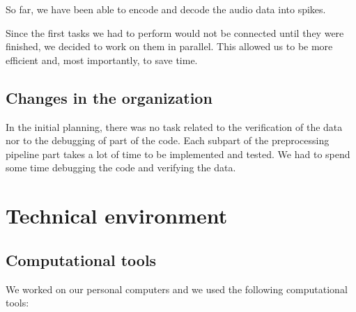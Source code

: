 \documentclass[11pt]{article}
\begin{document}
So far, we have been able to encode and decode the audio data into spikes.


Since the first tasks we had to perform would not be connected until they were finished, we decided to work on them in parallel. This allowed us to be more efficient and, most importantly, to save time.

\subsection{Changes in the organization}

In the initial planning, there was no task related to the verification of the data nor to the debugging of part of the code. Each subpart of the preprocessing pipeline part takes a lot of time to be implemented and tested. We had to spend some time debugging the code and verifying the data.


\pagebreak

\section{Technical environment}

\subsection{Computational tools}

We worked on our personal computers and we used the following computational tools:
\end{document}
